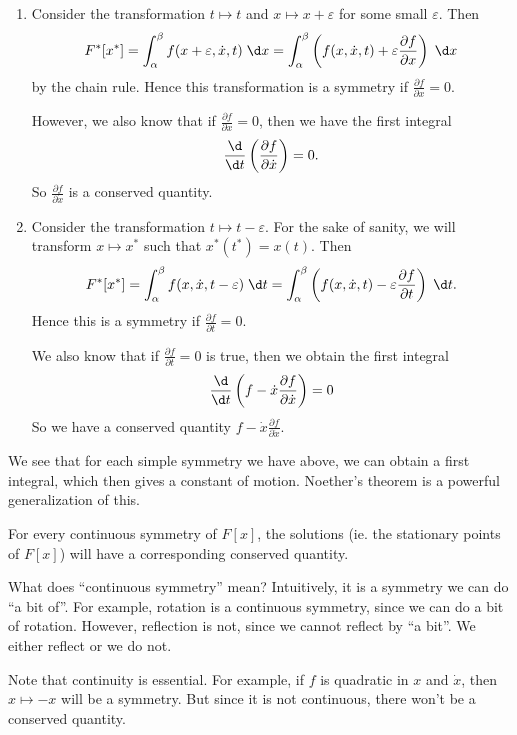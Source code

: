 \documentclass[a4paper]{article}
\begin{document}
\begin{eg}\leavevmode
  \begin{enumerate}
    \item Consider the transformation $t \mapsto t$ and $x \mapsto x + \varepsilon$ for some small $\varepsilon$. Then
      \[
        F^*[x^*] = \int_\alpha^\beta f(x + \varepsilon, \dot{x}, t)\;\d x = \int_\alpha^\beta \left(f(x, \dot{x}, t) + \varepsilon \frac{\partial f}{\partial x}\right)\;\d x
      \]
      by the chain rule. Hence this transformation is a symmetry if $\frac{\partial f}{\partial x} = 0$.

      However, we also know that if $\frac{\partial f}{\partial x} = 0$, then we have the first integral
      \[
        \frac{\d}{\d t}\left(\frac{\partial f}{\partial \dot{x}}\right) = 0.
      \]
      So $\frac{\partial f}{\partial \dot{x}}$ is a conserved quantity.
    \item Consider the transformation $t \mapsto t - \varepsilon$. For the sake of sanity, we will transform $x\mapsto x^*$ such that $x^*(t^*) = x(t)$. Then
      \[
        F^*[x^*] = \int_\alpha^\beta f(x, \dot{x}, t - \varepsilon)\;\d t = \int_\alpha^\beta \left(f(x, \dot{x}, t) - \varepsilon \frac{\partial f}{\partial t}\right)\;\d t.
      \]
      Hence this is a symmetry if $\frac{\partial f}{\partial t} = 0$.

      We also know that if $\frac{\partial f}{\partial t} = 0$ is true, then we obtain the first integral
      \[
        \frac{\d}{\d t}\left(f - \dot{x}\frac{\partial f}{\partial \dot{x}}\right) = 0
      \]
      So we have a conserved quantity $f - \dot{x}\frac{\partial f}{\partial \dot{x}}$.
  \end{enumerate}
\end{eg}
We see that for each simple symmetry we have above, we can obtain a first integral, which then gives a constant of motion. Noether's theorem is a powerful generalization of this.

\begin{thm}
  For every continuous symmetry of $F[x]$, the solutions (ie. the stationary points of $F[x]$) will have a corresponding conserved quantity.
\end{thm}
What does ``continuous symmetry'' mean? Intuitively, it is a symmetry we can do ``a bit of''. For example, rotation is a continuous symmetry, since we can do a bit of rotation. However, reflection is not, since we cannot reflect by ``a bit''. We either reflect or we do not.

Note that continuity is essential. For example, if $f$ is quadratic in $x$ and $\dot{x}$, then $x\mapsto -x$ will be a symmetry. But since it is not continuous, there won't be a conserved quantity.
\end{document}
